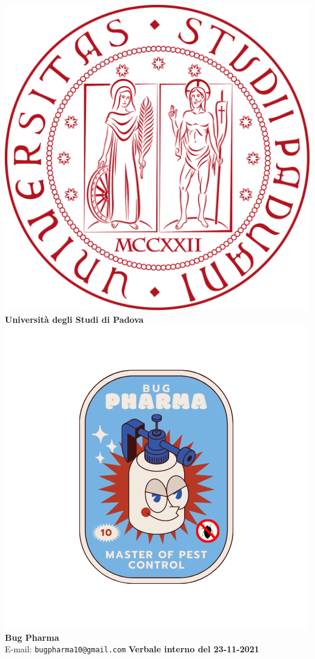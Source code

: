 \documentclass[11pt]{article}
\begin{document}
	\thispagestyle{empty}
	\begin{titlepage}
		\begin{center}
			\includegraphics[scale = 0.05]{../../Res/logo_unipd.png}\\
			\bigskip
			\large \textbf{Università degli Studi di Padova} \\
			\vfill
			\includegraphics[scale = 0.7]{../../Res/BugPharma_Logo.png}\\
			\large \textbf{Bug Pharma} \\
			\vfill
			\large
			E-mail: 
			\texttt{bugpharma10@gmail.com}
			\vfill
			\Huge \textbf{Verbale interno del 23-11-2021}\\
			

\end{center}
\end{titlepage}
\end{document}
